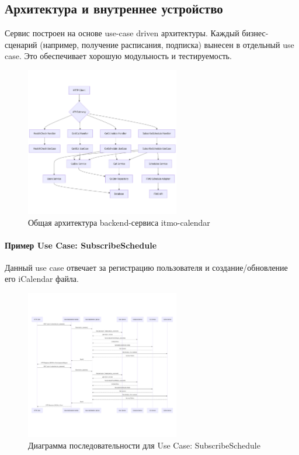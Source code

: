 \subsection{Архитектура и внутреннее устройство}
Сервис построен на основе use-case driven архитектуры. Каждый бизнес-сценарий (например, получение расписания, подписка) вынесен в отдельный use case. Это обеспечивает хорошую модульность и тестируемость.
\begin{figure}[h!]
    \centering
    \caption{Общая архитектура backend-сервиса itmo-calendar}
    \label{fig:backend-arch}
    \includegraphics[width=0.6\textwidth]{images/mermaid-1.png}
\end{figure}

\paragraph{Пример Use Case: SubscribeSchedule}
Данный use case отвечает за регистрацию пользователя и создание/обновление его iCalendar файла.
\begin{figure}[h!]
    \centering
    \caption{Диаграмма последовательности для Use Case: SubscribeSchedule}
    \label{fig:subscribe-sequence}
    \includegraphics[width=0.6\textwidth]{images/mermaid-2.png}
\end{figure}

